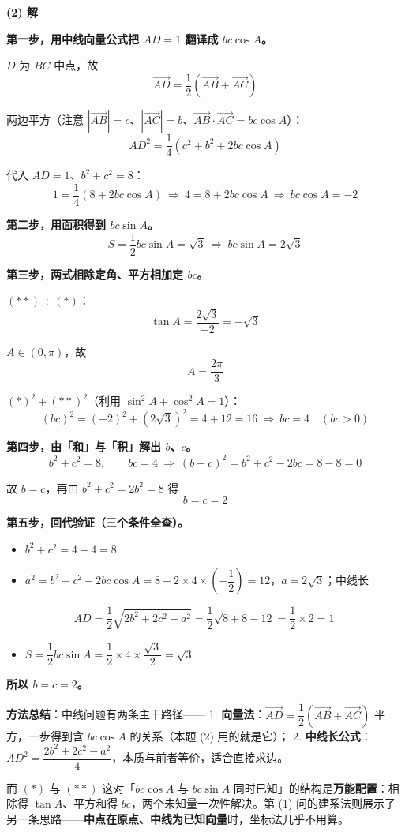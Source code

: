 \par\medskip

\textbf{(2) 解}

\textbf{第一步，用中线向量公式把 $AD=1$ 翻译成 $bc\cos A$。}

$D$ 为 $BC$ 中点，故
\[\overrightarrow{AD}=\frac12\left(\overrightarrow{AB}+\overrightarrow{AC}\right)\]

两边平方（注意 $\left|\overrightarrow{AB}\right|=c$、$\left|\overrightarrow{AC}\right|=b$、$\overrightarrow{AB}\cdot\overrightarrow{AC}=bc\cos A$）：
\[AD^{2}=\frac14\left(c^{2}+b^{2}+2bc\cos A\right)\]

代入 $AD=1$、$b^{2}+c^{2}=8$：
\[1=\frac14\left(8+2bc\cos A\right)\ \Longrightarrow\ 4=8+2bc\cos A\ \Longrightarrow\ bc\cos A=-2\tag{$*$}\]

\textbf{第二步，用面积得到 $bc\sin A$。}
\[S=\frac12bc\sin A=\sqrt3\ \Longrightarrow\ bc\sin A=2\sqrt3\tag{$**$}\]

\textbf{第三步，两式相除定角、平方相加定 $bc$。}

$(\ast\ast)\div(\ast)$：
\[\tan A=\frac{2\sqrt3}{-2}=-\sqrt3\]

$A\in(0,\pi)$，故
\[A=\frac{2\pi}3\]

$(\ast)^{2}+(\ast\ast)^{2}$（利用 $\sin^{2}A+\cos^{2}A=1$）：
\[(bc)^{2}=(-2)^{2}+\left(2\sqrt3\right)^{2}=4+12=16\ \Longrightarrow\ bc=4\quad(bc>0)\]

\textbf{第四步，由「和」与「积」解出 $b$、$c$。}
\[b^{2}+c^{2}=8,\qquad bc=4\ \Longrightarrow\ (b-c)^{2}=b^{2}+c^{2}-2bc=8-8=0\]

故 $b=c$，再由 $b^{2}+c^{2}=2b^{2}=8$ 得
\[b=c=2\]

\textbf{第五步，回代验证（三个条件全查）。}

\begin{itemize}
\item $b^{2}+c^{2}=4+4=8$ 
\item $a^{2}=b^{2}+c^{2}-2bc\cos A=8-2\times4\times\left(-\dfrac12\right)=12$，$a=2\sqrt3$；中线长
\end{itemize}
\[AD=\frac12\sqrt{2b^{2}+2c^{2}-a^{2}}=\frac12\sqrt{8+8-12}=\frac12\times2=1\ \]
\begin{itemize}
\item $S=\dfrac12bc\sin A=\dfrac12\times4\times\dfrac{\sqrt3}2=\sqrt3$ 
\end{itemize}

\textbf{所以 $b=c=2$。}

\begin{gktip}
\textbf{方法总结}：中线问题有两条主干路径——
1. \textbf{向量法}：$\overrightarrow{AD}=\dfrac12\left(\overrightarrow{AB}+\overrightarrow{AC}\right)$ 平方，一步得到含 $bc\cos A$ 的关系（本题 (2) 用的就是它）；
2. \textbf{中线长公式}：$AD^{2}=\dfrac{2b^{2}+2c^{2}-a^{2}}4$，本质与前者等价，适合直接求边。

而 $(\ast)$ 与 $(\ast\ast)$ 这对「$bc\cos A$ 与 $bc\sin A$ 同时已知」的结构是\textbf{万能配置}：相除得 $\tan A$、平方和得 $bc$，两个未知量一次性解决。第 (1) 问的建系法则展示了另一条思路——\textbf{中点在原点、中线为已知向量}时，坐标法几乎不用算。
\end{gktip}

